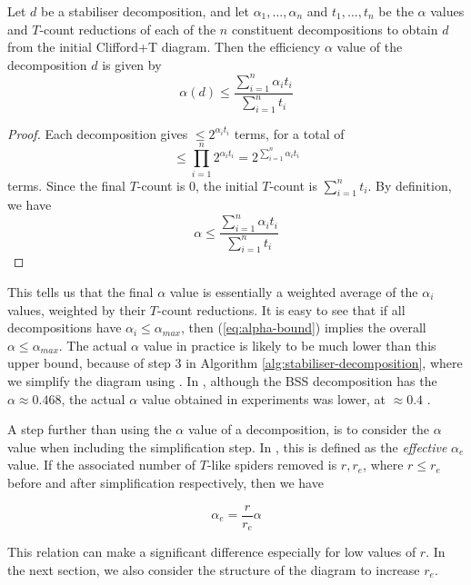 \begin{lemma}
    Let $d$ be a stabiliser decomposition, 
    and let $\alpha_1,...,\alpha_n$ and $t_1,...,t_n$ be the $\alpha$ values and $T$-count reductions
    of each of the $n$ constituent decompositions to obtain $d$ from the initial Clifford+T diagram.
    Then the efficiency $\alpha$ value of the decomposition $d$ is given by
\begin{equation}
    \label{eq:alpha-bound}
    \alpha(d) \leq \frac{\sum_{i=1}^n \alpha_i t_i}{\sum_{i=1}^n t_i}
\end{equation}
\end{lemma}

\begin{proof}
    Each decomposition gives $\leq 2^{\alpha_i t_i}$ terms, for a total of
    \[\leq \prod_{i=1}^{n} 2^{\alpha_i t_i} = 2^{\sum_{i=1}^n \alpha_i t_i}\]
    terms. Since the final $T$-count is 0, the initial $T$-count is $\sum_{i=1}^n t_i$.
    By definition, we have 
    \[\alpha \leq \frac{\sum_{i=1}^n \alpha_i t_i}{\sum_{i=1}^n t_i}\]
\end{proof}

This tells us that the final $\alpha$ value is essentially a weighted average of the $\alpha_i$ values,
weighted by their $T$-count reductions.
It is easy to see that if all decompositions have $\alpha_i \leq \alpha_{max}$,
then (\ref{eq:alpha-bound}) implies the overall $\alpha \leq \alpha_{max}$.
The actual $\alpha$ value in practice is likely to be much lower than this upper bound,
because of step 3 in Algorithm \ref{alg:stabiliser-decomposition}, 
where we simplify the diagram using .
In \cite{Kissinger_2022}, although the BSS decomposition has the $\alpha \approx 0.468$,
the actual $\alpha$ value obtained in experiments was lower, at $\approx 0.4$ \cite{sutcliffe2024proccut}.

A step further than using the $\alpha$ value of a decomposition,
is to consider the $\alpha$ value when including the simplification step.
In \cite{Codsi2022}, this is defined as the \textit{effective} $\alpha_e$ value.
If the associated number of $T$-like spiders removed is $r,r_e$, where $r \leq r_e$ 
before and after simplification respectively, then we have

\begin{equation}
    \label{eq:effective-alpha}
    \alpha_e = \frac{r}{r_e} \alpha
\end{equation}

This relation can make a significant difference especially for low values of $r$.
In the next section, we also consider the structure of the diagram to increase $r_e$.


